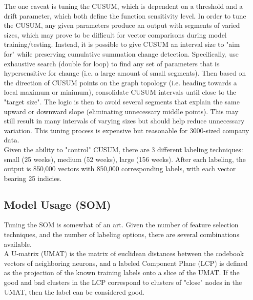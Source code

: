 \documentclass[preprint,12pt]{elsarticle}
\begin{document}
The one caveat is tuning the CUSUM, which is dependent on a threshold and a drift parameter, which both define the function sensitivity level. In order to tune the CUSUM, any given parameters produce an output with segments of varied sizes, which may prove to be difficult for vector comparisons during model training/testing. Instead, it is possible to give CUSUM an interval size to "aim for" while preserving cumulative summation change detection. Specifically, use exhaustive search (double for loop) to find any set of parameters that is hypersensitive for change (i.e. a large amount of small segments). Then based on the direction of CUSUM points on the graph topology (i.e. heading towards a local maximum or minimum), consolidate CUSUM intervals until close to the "target size". The logic is then to avoid several segments that explain the same upward or downward slope (eliminating unnecessary middle points). This may still result in many intervals of varying sizes but should help reduce unnecessary variation. This tuning process is expensive but reasonable for 3000-sized company data. \\

Given the ability to "control" CUSUM, there are 3 different labeling techniques: small (25 weeks), medium (52 weeks), large (156 weeks). After each labeling, the output is 850,000 vectors with 850,000 corresponding labels, with each vector bearing 25 indicies. 

\subsection{Model Usage (SOM)}
Tuning the SOM is somewhat of an art. Given the number of feature selection techniques, and the number of labeling options, there are several combinations available. \\

A U-matrix (UMAT) is the matrix of euclidean distances between the codebook vectors of neighboring neurons, and a labeled Component Plane (LCP) is defined as the projection of the known training labels onto a slice of the UMAT. If the good and bad clusters in the LCP correspond to clusters of "close" nodes in the UMAT, then the label can be considered good. 
\end{document}
